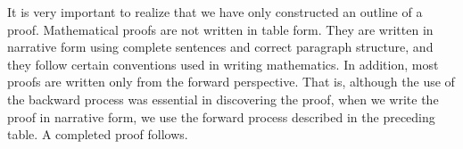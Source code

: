 %
%
It is very important to realize that we have only constructed an outline of a proof.  Mathematical proofs are not written in table form.  They are written in narrative form using complete sentences and correct paragraph structure, and they follow certain conventions used in writing mathematics.  In addition, most proofs are written only from the forward perspective.  That is, although the use of the backward process was essential in discovering the proof, when we write the proof in narrative form, we use the forward process described in the preceding table.
%
  A completed proof follows.

\hbreak


